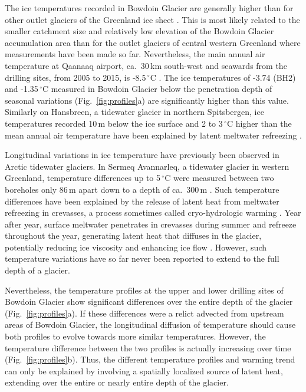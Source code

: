 \documentclass[utf8]{article}
\begin{document}
    The ice temperatures recorded in Bowdoin Glacier are generally higher than
    for other outlet glaciers of the Greenland ice sheet \citep{Iken.etal.1993,
    Luthi.etal.2002, Luthi.etal.2015, Harrington.etal.2015}. This is most
    likely related to the smaller catchment size and relatively low elevation
    of the Bowdoin Glacier accumulation area than for the outlet glaciers
    of central western Greenland where measurements have been made so far.
    Nevertheless, the main annual air temperature at Qaanaaq airport,
    ca.~30\,km south-west and seawards from the drilling sites, from 2005 to
    2015, is -8.5\,$^\circ$C \citep{Sugiyama.etal.2014, Tsutaki.etal.2017}. The
    ice temperatures of -3.74 (BH2) and -1.35\,$^\circ$C measured in Bowdoin
    Glacier below the penetration depth of seasonal variations
    (Fig.~\ref{fig:profiles}a) are significantly higher than this value.
    Similarly on Hansbreen, a tidewater glacier in northern Spitsbergen, ice
    temperatures recorded 10\,m below the ice surface and 2 to 3\,$^\circ$C
    higher than the mean annual air temperature have been explained by latent
    meltwater refreezing \citep{Jania.etal.1996}.

    Longitudinal variations in ice temperature have previously been observed in
    Arctic tidewater glaciers. In Sermeq Avannarleq, a tidewater glacier in
    western Greenland, temperature differences up to 5\,$^\circ$C were measured
    between two boreholes only 86\,m apart down to a depth of ca.~300\,m
    \citep{Luthi.etal.2015}.
    Such temperature differences have been explained by the release of latent
    heat from meltwater refreezing in crevasses, a process sometimes called
    cryo-hydrologic warming \citep{Phillips.etal.2010}. Year after year,
    surface meltwater penetrates in crevasses during summer and refreeze
    throughout the year, generating latent heat that diffuses in the
    glacier, potentially reducing ice viscosity and enhancing ice flow
    \citep{Phillips.etal.2013}. However, such temperature variations have so
    far never been reported to extend to the full depth of a glacier.

    Nevertheless, the temperature profiles at the upper and lower drilling
    sites of Bowdoin Glacier show significant differences over the entire depth
    of the glacier (Fig.~\ref{fig:profiles}a). If these differences were a
    relict advected from upstream areas of Bowdoin Glacier, the longitudinal
    diffusion of temperature should cause both profiles to evolve towards more
    similar temperatures. However, the temperature difference between the two
    profiles is actually increasing over time (Fig.~\ref{fig:profiles}b).
    Thus, the different temperature profiles and warming trend can only be
    explained by involving a spatially localized source of latent heat,
    extending over the entire or nearly entire depth of the glacier.
\end{document}
